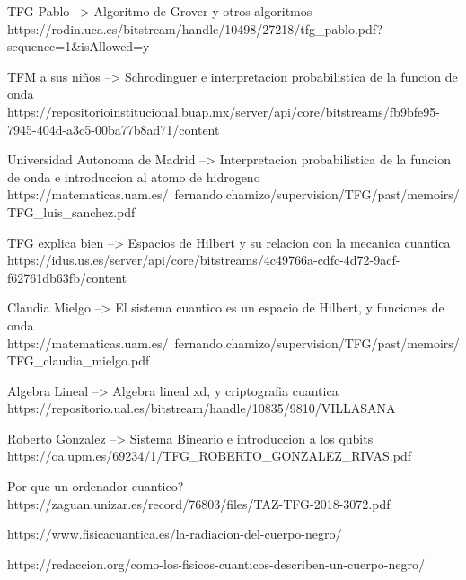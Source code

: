 \documentclass{article}
\begin{document}
    TFG Pablo --> Algoritmo de Grover y otros algoritmos
    https://rodin.uca.es/bitstream/handle/10498/27218/tfg\_pablo.pdf?sequence=1\&isAllowed=y

    TFM a sus niños --> Schrodinguer e interpretacion probabilistica de la funcion de onda
    https://repositorioinstitucional.buap.mx/server/api/core/bitstreams/fb9bfe95-7945-404d-a3c5-00ba77b8ad71/content

    Universidad Autonoma de Madrid --> Interpretacion probabilistica de la funcion de onda e introduccion al atomo de hidrogeno
    https://matematicas.uam.es/~fernando.chamizo/supervision/TFG/past/memoirs/TFG\_luis\_sanchez.pdf

    TFG explica bien --> Espacios de Hilbert y su relacion con la mecanica cuantica
    https://idus.us.es/server/api/core/bitstreams/4c49766a-cdfc-4d72-9acf-f62761db63fb/content

    Claudia Mielgo --> El sistema cuantico es un espacio de Hilbert, y funciones de onda 
    https://matematicas.uam.es/~fernando.chamizo/supervision/TFG/past/memoirs/TFG\_claudia\_mielgo.pdf

    Algebra Lineal --> Algebra lineal xd, y criptografia cuantica
    https://repositorio.ual.es/bitstream/handle/10835/9810/VILLASANA%

    Roberto Gonzalez --> Sistema Bineario e introduccion a los qubits
    https://oa.upm.es/69234/1/TFG\_ROBERTO\_GONZALEZ\_RIVAS.pdf

    Por que un ordenador cuantico?
    https://zaguan.unizar.es/record/76803/files/TAZ-TFG-2018-3072.pdf

    https://www.fisicacuantica.es/la-radiacion-del-cuerpo-negro/

    https://redaccion.org/como-los-fisicos-cuanticos-describen-un-cuerpo-negro/
    
\end{document}
